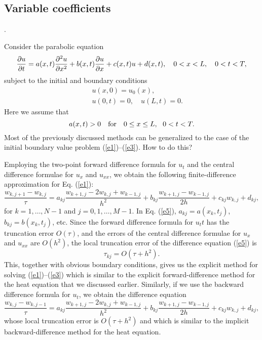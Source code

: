\subsection{Variable coefficients}.

Consider the parabolic equation
\begin{equation}
\frac{{\partial} u}{{\partial} t} =a(x,t)\frac{{\partial}^{2} u}{{\partial} x^{2}}+
b(x,t)\frac{{\partial} u}{{\partial} x}+c(x,t)u+d(x,t),  \quad 0<x< L, \quad 0<t<T, \label{e1}
\end{equation}
subject to the initial and boundary conditions
\begin{eqnarray}
&&u(x, 0) = u_{0}(x), \label{e2} \\
&&u(0,t)=0, \quad u(L,t)=0.   \label{e3}
\end{eqnarray}
Here we assume that
\begin{equation}
a(x,t)> 0 \quad {\rm for} \quad 0\leq x\leq L, \ \ 0<t<T. \label{e4}
\end{equation}
Most of the previously discussed methods can be generalized to the case of
the initial boundary value problem (\ref{e1})--(\ref{e3}).  How to do this?
 
Employing the two-point forward difference formula for $u_t$ and
the central difference formulae for $u_x$ and $u_{xx}$, we obtain
the following finite-difference approximation for Eq. (\ref{e1}):
\begin{equation}
\frac{w_{k,j+1}-w_{k,j}}{\tau} =a_{kj}\frac{w_{k+1,j}-2w_{k,j}+w_{k-1,j}}{h^{2}}+
b_{kj}\frac{w_{k+1,j}-w_{k-1,j}}{2h}+c_{kj}w_{k,j}+d_{kj},   \label{e5}
\end{equation}
for $k=1, \dots,N-1$ and $j=0, 1,\dots,M-1$. In Eq. (\ref{e5}),
$a_{kj}=a(x_{k},t_{j})$, $b_{kj}=b(x_{k},t_{j})$, etc. Since
the forward difference formula
for $u_tt$ has the truncation error $O(\tau)$, and
the errors of the central difference formulae for $u_x$ and $u_{xx}$
are $O(h^2)$, the local truncation error of the difference equation (\ref{e5}) is
\[
\tau_{kj}=O(\tau+h^2).
\]
This, together with obvious boundary conditions, gives us the explicit method
for solving (\ref{e1})--(\ref{e3}) which is similar to the explicit
forward-difference method for the heat equation that we discussed earlier.
Similarly, if we use the backward difference formula for $u_t$, we obtain
the difference equation
\begin{equation}
\frac{w_{k,j}-w_{k,j-1}}{\tau} =a_{kj}\frac{w_{k+1,j}-2w_{k,j}+w_{k-1,j}}{h^{2}}+
b_{kj}\frac{w_{k+1,j}-w_{k-1,j}}{2h}+c_{kj}w_{k,j}+d_{kj},   \label{e6}
\end{equation}
whose local truncation error is $O(\tau+h^2)$ and which is similar to the implicit
backward-difference method for the heat equation.
 
